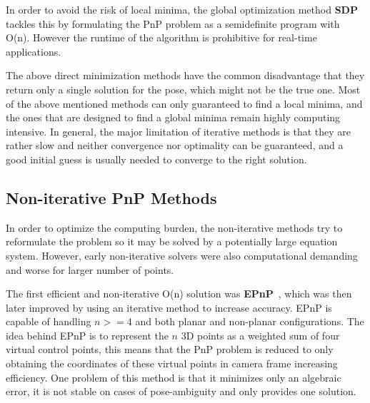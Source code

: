 \documentclass[letterpaper, 10 pt, conference]{ieeeconf}  %
\begin{document}
	
	In order to avoid the risk of local minima, the global optimization method \textbf{SDP}~\cite{Schweighofer2008} tackles this by formulating the PnP problem as a semidefinite program with O(n). However the runtime of the algorithm is prohibitive for real-time applications. %
	
	The above direct minimization methods \cite{Oberkampf1996,Lu2000,Garro2012,Schweighofer2008} have the common disadvantage that they return only a single solution for the pose, which might not be the true one. Most of the above mentioned methods can only guaranteed to find a local minima, and the ones that are designed to find a global minima remain highly computing intensive. In general, the major limitation of iterative methods is that they are rather slow and neither convergence nor optimality can be guaranteed, and a good initial guess is usually needed to converge to the right solution.
	
	
	\subsection{Non-iterative PnP Methods}
	
	In order to optimize the computing burden, the non-iterative methods try to reformulate the problem so it may be solved by a potentially large equation system. However, early non-iterative solvers were also computational demanding and worse for larger number of points.
	
	The first efficient and non-iterative O(n) solution was \textbf{EPnP}~\cite{Lepetit2008}, which was then later improved by using an iterative method to increase accuracy. EPnP is capable of handling $n >= 4$ and both planar and non-planar configurations. The idea behind EPnP is to represent the $n$ 3D points as a weighted sum of four virtual control points, this means that the PnP problem is reduced to only obtaining the coordinates of these virtual points in camera frame increasing efficiency. One problem of this method is that it minimizes only an algebraic error, it is not stable on cases of pose-ambiguity and only provides one solution. %
	
\end{document}
